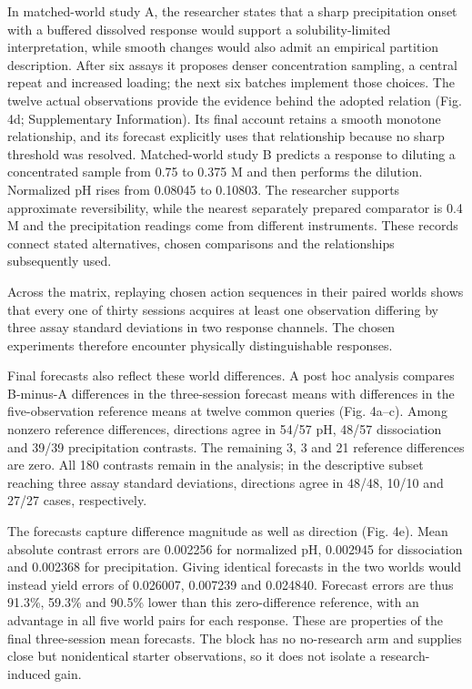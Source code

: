 \documentclass[12pt,a4paper]{article}
\begin{document}
In matched-world study A, the researcher states that a sharp precipitation onset with a buffered dissolved response would support a solubility-limited interpretation, while smooth changes would also admit an empirical partition description. After six assays it proposes denser concentration sampling, a central repeat and increased loading; the next six batches implement those choices. The twelve actual observations provide the evidence behind the adopted relation (Fig. 4d; Supplementary Information). Its final account retains a smooth monotone relationship, and its forecast explicitly uses that relationship because no sharp threshold was resolved. Matched-world study B predicts a response to diluting a concentrated sample from 0.75 to 0.375 M and then performs the dilution. Normalized pH rises from 0.08045 to 0.10803. The researcher supports approximate reversibility, while the nearest separately prepared comparator is 0.4 M and the precipitation readings come from different instruments. These records connect stated alternatives, chosen comparisons and the relationships subsequently used.

Across the matrix, replaying chosen action sequences in their paired worlds shows that every one of thirty sessions acquires at least one observation differing by three assay standard deviations in two response channels. The chosen experiments therefore encounter physically distinguishable responses.

Final forecasts also reflect these world differences. A post hoc analysis compares B-minus-A differences in the three-session forecast means with differences in the five-observation reference means at twelve common queries (Fig. 4a--c). Among nonzero reference differences, directions agree in 54/57 pH, 48/57 dissociation and 39/39 precipitation contrasts. The remaining 3, 3 and 21 reference differences are zero. All 180 contrasts remain in the analysis; in the descriptive subset reaching three assay standard deviations, directions agree in 48/48, 10/10 and 27/27 cases, respectively.

The forecasts capture difference magnitude as well as direction (Fig. 4e). Mean absolute contrast errors are 0.002256 for normalized pH, 0.002945 for dissociation and 0.002368 for precipitation. Giving identical forecasts in the two worlds would instead yield errors of 0.026007, 0.007239 and 0.024840. Forecast errors are thus 91.3\%, 59.3\% and 90.5\% lower than this zero-difference reference, with an advantage in all five world pairs for each response. These are properties of the final three-session mean forecasts. The block has no no-research arm and supplies close but nonidentical starter observations, so it does not isolate a research-induced gain.
\end{document}
